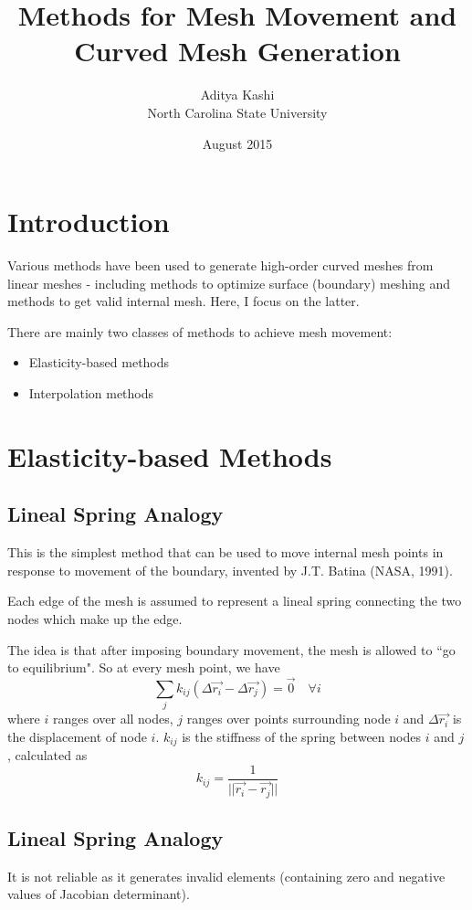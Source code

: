 \documentclass{article}
\title{Methods for Mesh Movement and Curved Mesh Generation}
\author{Aditya Kashi \\ North Carolina State University}
\date{August 2015}
\begin{document}
\maketitle

\section{Introduction}

Various methods have been used to generate high-order curved meshes from linear meshes - including methods to optimize surface (boundary) meshing and methods to get valid internal mesh. Here, I focus on the latter.

There are mainly two classes of methods to achieve mesh movement:
\begin{itemize}
\item Elasticity-based methods
\item Interpolation methods
\end{itemize}

\section{Elasticity-based Methods}

\subsection{Lineal Spring Analogy}
This is the simplest method that can be used to move internal mesh points in response to movement of the boundary, invented by J.T. Batina (NASA, 1991).

Each edge of the mesh is assumed to represent a lineal spring connecting the two nodes which make up the edge.

The idea is that after imposing boundary movement, the mesh is allowed to ``go to equilibrium". So at every mesh point, we have
\begin{equation}
\sum_j k_{ij}(\Delta \vec{r_i} - \Delta \vec{r_j}) = \vec{0} \quad \forall i
\end{equation}
where $i$ ranges over all nodes, $j$ ranges over points surrounding node $i$ and $\Delta \vec{r_i}$ is the displacement of node $i$.
$k_{ij}$ is the stiffness of the spring between nodes $i$ and $j$, calculated as
\begin{equation}
k_{ij} = \frac{1}{||\vec{r_i} - \vec{r_j}||}
\end{equation}
 

\subsection{Lineal Spring Analogy}
It is not reliable as it generates invalid elements (containing zero and negative values of Jacobian determinant).
\end{document}
